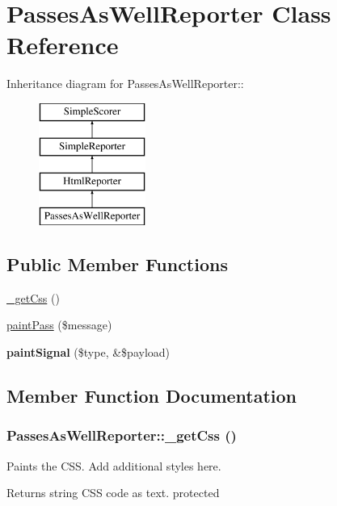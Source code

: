 \hypertarget{class_passes_as_well_reporter}{
\section{PassesAsWellReporter Class Reference}
\label{class_passes_as_well_reporter}
}
Inheritance diagram for PassesAsWellReporter::\begin{figure}[H]
\begin{center}
\leavevmode
\includegraphics[height=4cm]{class_passes_as_well_reporter}
\end{center}
\end{figure}
\subsection*{Public Member Functions}
\begin{DoxyCompactItemize}
\item 
\hyperlink{class_passes_as_well_reporter_a8f5c1e45938a73ffd2f910820b2b14ca}{\_\-getCss} ()
\item 
\hyperlink{class_passes_as_well_reporter_a5dd3369d83cca3dded4900b1cb209f51}{paintPass} (\$message)
\item 
\hypertarget{class_passes_as_well_reporter_a04e5712b236a3510c411688adc76ae6a}{
{\bfseries paintSignal} (\$type, \&\$payload)}
\label{class_passes_as_well_reporter_a04e5712b236a3510c411688adc76ae6a}

\end{DoxyCompactItemize}


\subsection{Member Function Documentation}
\hypertarget{class_passes_as_well_reporter_a8f5c1e45938a73ffd2f910820b2b14ca}{
\subsubsection[{\_\-getCss}]{\setlength{\rightskip}{0pt plus 5cm}PassesAsWellReporter::\_\-getCss ()}}
\label{class_passes_as_well_reporter_a8f5c1e45938a73ffd2f910820b2b14ca}
Paints the CSS. Add additional styles here. \begin{DoxyReturn}{Returns}
string CSS code as text.  protected 
\end{DoxyReturn}


